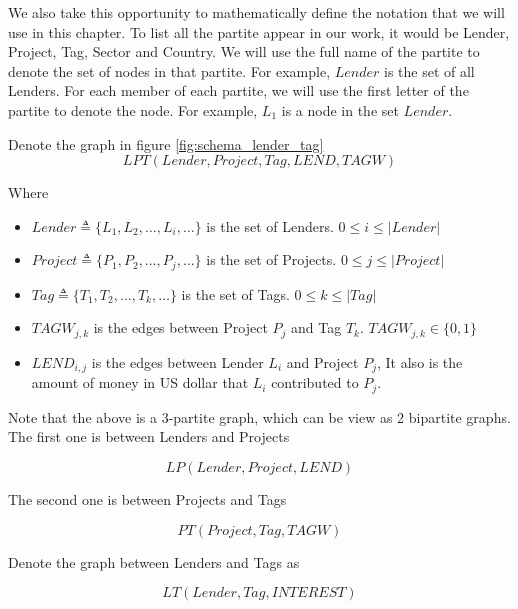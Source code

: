 We also take this opportunity to mathematically define the notation that we will use in this chapter.
To list all the partite appear in our work, it would be Lender, Project, Tag, Sector and Country.
We will use the full name of the partite to denote the set of nodes in that partite.
For example, $Lender$ is the set of all Lenders.
For each member of each partite, we will use the first letter of the partite to denote the node.
For example, $L_1$ is a node in the set $Lender$.

Denote the graph in figure \ref{fig:schema_lender_tag}
\begin{equation}
	LPT(Lender, Project, Tag, LEND, TAGW)
\end{equation}

Where

\begin{itemize}
	\item $Lender \triangleq \{L_1, L_2, \ldots, L_i,\ldots \}$ is the set of Lenders. $0 \le i \le |Lender|$
	\item $Project \triangleq \{P_1, P_2, \ldots, P_j,\ldots \}$ is the set of Projects. $0 \le j \le |Project|$
	\item $Tag \triangleq \{T_1, T_2, \ldots, T_k,\ldots \}$ is the set of Tags. $0\le k \le |Tag|$
	\item $TAGW_{j,k}$ is the edges between Project $P_j$ and Tag $T_k$. $TAGW_{j,k} \in \{0, 1\}$
	\item $LEND_{i,j}$ is the edges between Lender $L_i$ and Project $P_j$,
	      It also is the amount of money in US dollar that $L_i$ contributed to $P_j$.
\end{itemize}

Note that the above is a 3-partite graph, which can be view as 2 bipartite graphs.
The first one is between Lenders and Projects

\begin{equation}
	LP(Lender, Project, LEND)
\end{equation}

The second one is between Projects and Tags

\begin{equation}
	PT(Project, Tag, TAGW)
\end{equation}

Denote the graph between Lenders and Tags as

\begin{equation}
	LT(Lender, Tag, INTEREST)
\end{equation}


